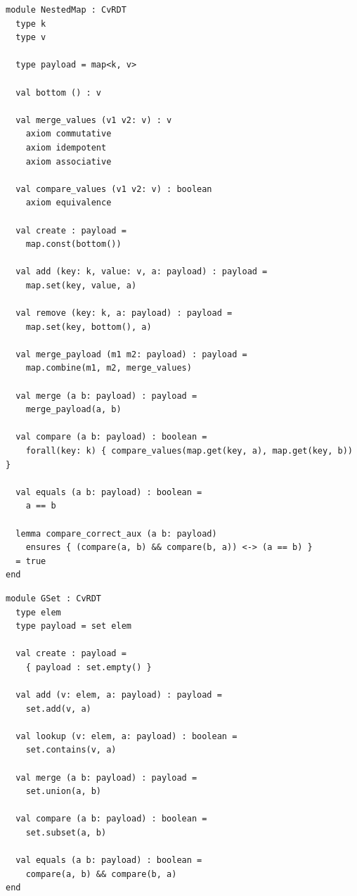 \begin{lstlisting}[caption={\texttt{NestedMap}}, label={lst:app_nestedmap}]
module NestedMap : CvRDT
  type k
  type v

  type payload = map<k, v>

  val bottom () : v

  val merge_values (v1 v2: v) : v
    axiom commutative
    axiom idempotent
    axiom associative

  val compare_values (v1 v2: v) : boolean
    axiom equivalence

  val create : payload =
    map.const(bottom())

  val add (key: k, value: v, a: payload) : payload =
    map.set(key, value, a)

  val remove (key: k, a: payload) : payload =
    map.set(key, bottom(), a)

  val merge_payload (m1 m2: payload) : payload =
    map.combine(m1, m2, merge_values)

  val merge (a b: payload) : payload =
    merge_payload(a, b)

  val compare (a b: payload) : boolean =
    forall(key: k) { compare_values(map.get(key, a), map.get(key, b)) }

  val equals (a b: payload) : boolean =
    a == b

  lemma compare_correct_aux (a b: payload)
    ensures { (compare(a, b) && compare(b, a)) <-> (a == b) }
  = true
end
\end{lstlisting}

\begin{lstlisting}[caption={\texttt{GSet}}, label={lst:app_gset}]
module GSet : CvRDT
  type elem
  type payload = set elem

  val create : payload = 
    { payload : set.empty() }

  val add (v: elem, a: payload) : payload =
    set.add(v, a)

  val lookup (v: elem, a: payload) : boolean =
    set.contains(v, a)

  val merge (a b: payload) : payload =
    set.union(a, b)

  val compare (a b: payload) : boolean =
    set.subset(a, b)

  val equals (a b: payload) : boolean =
    compare(a, b) && compare(b, a)
end
\end{lstlisting}

